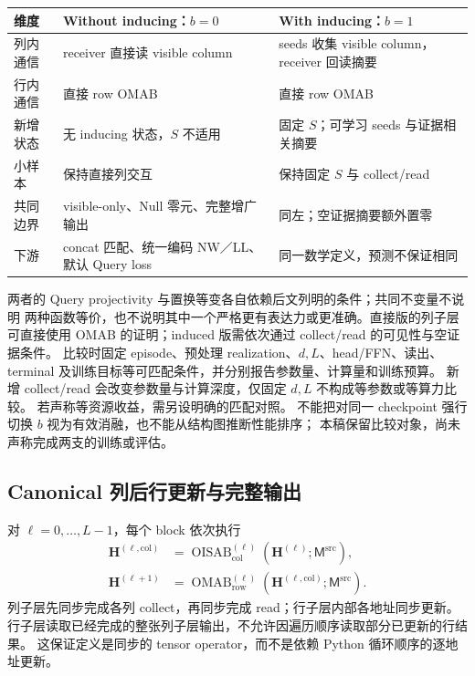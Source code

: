 \documentclass[11pt,UTF8,fontset=fandol]{ctexart}
\numberwithin{equation}{section}
\theoremstyle{definition}
\newcommand{\OMAB}{\operatorname{OMAB}}
\begin{document}
\begin{center}
\small
\begin{tabularx}{\textwidth}{lXX}
\toprule
维度 & Without inducing：$b=0$ & With inducing：$b=1$\\
\midrule
列内通信 & receiver 直接读 visible column & seeds 收集 visible column，receiver 回读摘要\\
行内通信 & 直接 row OMAB & 直接 row OMAB\\
新增状态 & 无 inducing 状态，$S$ 不适用 & 固定 $S$；可学习 seeds 与证据相关摘要\\
小样本 & 保持直接列交互 & 保持固定 $S$ 与 collect/read\\
共同边界 & visible-only、Null 零元、完整增广输出 & 同左；空证据摘要额外置零\\
下游 & concat 匹配、统一编码 NW／LL、默认 Query loss & 同一数学定义，预测不保证相同\\
\bottomrule
\end{tabularx}
\end{center}

两者的 Query projectivity 与置换等变各自依赖后文列明的条件；共同不变量不说明
两种函数等价，也不说明其中一个严格更有表达力或更准确。直接版的列子层可直接使用
OMAB 的证明；induced 版需依次通过 collect/read 的可见性与空证据条件。
比较时固定 episode、预处理 realization、$d,L$、head/FFN、读出、terminal
及训练目标等可匹配条件，并分别报告参数量、计算量和训练预算。
新增 collect/read 会改变参数量与计算深度，仅固定 $d,L$ 不构成等参数或等算力比较。
若声称等资源收益，需另设明确的匹配对照。
不能把对同一 checkpoint 强行切换 $b$ 视为有效消融，也不能从结构图推断性能排序；
本稿保留比较对象，尚未声称完成两支的训练或评估。


\subsection{Canonical 列后行更新与完整输出}
\label{subsec:A:axis-composition}

对 $\ell=0,\ldots,L-1$，每个 block 依次执行
\begin{equation}
 \begin{aligned}
  \bm H^{(\ell,\mathrm{col})}
    &=\operatorname{OISAB}_{\mathrm{col}}^{(\ell)}
       (\bm H^{(\ell)};\mathsf M^{\mathrm{src}}),\\
  \bm H^{(\ell+1)}
    &=\OMAB_{\mathrm{row}}^{(\ell)}
       (\bm H^{(\ell,\mathrm{col})};\mathsf M^{\mathrm{src}}).
 \end{aligned}
 \label{eq:A:two-axis}
\end{equation}
列子层先同步完成各列 collect，再同步完成 read；行子层内部各地址同步更新。
行子层读取已经完成的整张列子层输出，不允许因遍历顺序读取部分已更新的行结果。
这保证定义是同步的 tensor operator，而不是依赖 Python 循环顺序的逐地址更新。
\end{document}
